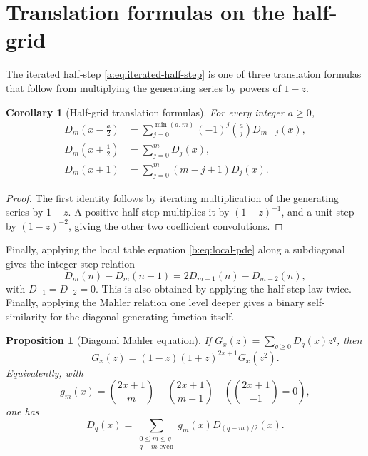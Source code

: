 \documentclass[11pt,a4paper,oneside,openany]{book}
\numberwithin{equation}{chapter}
\newtheorem{proposition}[theorem]{Proposition}
\newtheorem{corollary}[theorem]{Corollary}
\theoremstyle{definition}
\theoremstyle{remark}
\newcommand{\Diag}{D}
\begin{document}
\section{Translation formulas on the half-grid}
The iterated half-step \eqref{a:eq:iterated-half-step} is one of three
translation formulas that follow from multiplying the generating series by
powers of $1-z$.

\begin{corollary}[Half-grid translation formulas]
\label{b:cor:translations}
For every integer $a\ge0$,
\begin{align}
 \Diag_m\!\left(x-\frac a2\right)
 &=\sum_{j=0}^{\min(a,m)}(-1)^j\binom aj\Diag_{m-j}(x),
 \label{b:eq:negative-shift}\\
 \Diag_m\!\left(x+\frac12\right)
 &=\sum_{j=0}^{m}\Diag_j(x),
 \label{b:eq:positive-half-shift}\\
 \Diag_m(x+1)
 &=\sum_{j=0}^{m}(m-j+1)\Diag_j(x).
 \label{b:eq:unit-shift}
\end{align}
\end{corollary}

\begin{proof}
The first identity follows by iterating multiplication of the generating
series by $1-z$.  A positive half-step multiplies it by $(1-z)^{-1}$, and a
unit step by $(1-z)^{-2}$, giving the other two coefficient convolutions.
\end{proof}
Finally, applying the local table equation \eqref{b:eq:local-pde} along a
subdiagonal gives the integer-step relation
\begin{equation}
 \Diag_m(n)-\Diag_m(n-1)
 =2\Diag_{m-1}(n)-\Diag_{m-2}(n),
 \label{b:eq:diagonal-local}
\end{equation}
with $\Diag_{-1}=\Diag_{-2}=0$.  This is also obtained by applying the
half-step law twice.
Finally, applying the Mahler relation one level deeper gives a binary
self-similarity for the diagonal generating function itself.

\begin{proposition}[Diagonal Mahler equation]
If \(G_x(z)=\sum_{q\geq0}\Diag_q(x)z^q\), then
\begin{equation}
 \boxed{G_x(z)=(1-z)(1+z)^{2x+1}G_x(z^2).}                 \label{c:eq:diag-mahler}
\end{equation}
Equivalently, with
\[
 g_m(x)=\binom{2x+1}{m}-\binom{2x+1}{m-1}
 \quad\left(\binom{2x+1}{-1}=0\right),
\]
one has
\begin{equation}
 \Diag_q(x)=
 \sum_{\substack{0\leq m\leq q\\q-m\text{ even}}}
 g_m(x)\Diag_{(q-m)/2}(x).                                 \label{c:eq:binary-diag-rec}
\end{equation}
\end{proposition}
\end{document}
